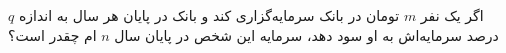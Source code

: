 \p
    اگر یک نفر
    $m$
    تومان در بانک سرمایه‌گزاری کند و بانک در پایان هر سال به اندازه
    $q$
    درصد سرمایه‌اش به او سود دهد،
    سرمایه
    این شخص در پایان سال
    $n$
    ام چقدر است؟